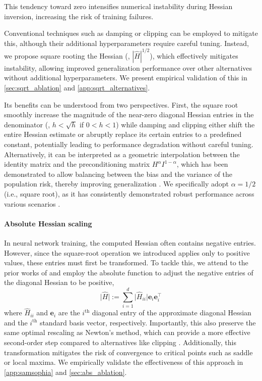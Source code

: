 This tendency toward zero intensifies numerical instability during Hessian inversion, increasing the risk of training failures.

Conventional techniques such as damping or clipping can be employed to mitigate this, although their additional hyperparameters require careful tuning.
Instead, we propose square rooting the Hessian (\ie, $|\widehat{H}|^{1/2}$), which effectively mitigates instability, allowing improved generalization performance over other alternatives without additional hyperparameters. 
We present empirical validation of this in \cref{sec:sqrt_ablation} and \cref{app:sqrt_alternatives}.

Its benefits can be understood from two perspectives.
First, the square root smoothly increase the magnitude of the near-zero diagonal Hessian entries in the denominator (\ie, $h<\sqrt{h}$ if $0<h<1$) while damping and clipping either shift the entire Hessian estimate or abruptly replace its certain entries to a predefined constant, potentially leading to performance degradation without careful tuning.
Alternatively, it can be interpreted as a geometric interpolation between the identity matrix and the preconditioning matrix $ H^{\alpha}I^{1-\alpha}$, which has been demonstrated to allow balancing between the bias and the variance of the population risk, thereby improving generalization \citep{amari2021when}.
We specifically adopt $\alpha = 1 / 2$ (i.e., square root), as it has consistently demonstrated robust performance across various scenarios \citep{amari2021when, kingma2014adam}.

\paragraph{Absolute Hessian scaling}
In neural network training, the computed Hessian often contains negative entries.
However, since the square-root operation we introduced applies only to positive values, these entries must first be transformed.
To tackle this, we attend to the prior works of \citet{becker1988improving, adahessian} and employ the absolute function to adjust the negative entries of the diagonal Hessian to be positive, \ie
\begin{equation}
    \lvert \widehat{H} \rvert := \sum_{i=1}^d \lvert \widehat{H}_{ii} \rvert \mathbf{e}_i\mathbf{e}_i^\top
\end{equation}
where $\widehat{H}_{ii}$ and $\mathbf{e}_i$ are the $i^{\text{th}}$ diagonal entry of the approximate diagonal Hessian and the $i^{\text{th}}$ standard basis vector, respectively.
Importantly, this also preserve the same optimal rescaling as Newton’s method, which can provide a more effective second-order step compared to alternatives like clipping \citep{nocedal1999numerical, murry2010newton, dauphin2014identifying, wang2013eigenvalue}. 
Additionally, this transformation mitigates the risk of convergence to critical points such as saddle or local maxima.
We empirically validate the effectiveness of this approach in \cref{app:samsophia} and \cref{sec:abs_ablation}.

